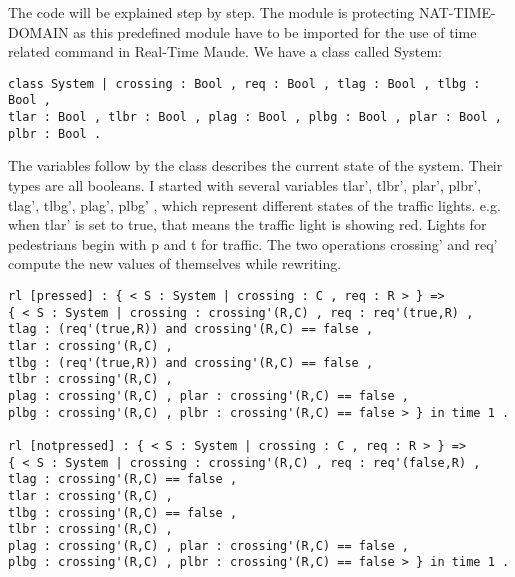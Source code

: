 \documentclass{article}
\begin{document}
The code will be explained step by step. 
The module is protecting NAT-TIME-DOMAIN as this predefined module have to be imported for the use of time related command in Real-Time Maude.
We have a class called System:
\begin{verbatim}
class System | crossing : Bool , req : Bool , tlag : Bool , tlbg : Bool , 
tlar : Bool , tlbr : Bool , plag : Bool , plbg : Bool , plar : Bool , plbr : Bool .
\end{verbatim}
The variables follow by the class describes the current state of the system. Their types are all  booleans.
I started with several variables tlar', tlbr', plar', plbr', tlag', tlbg', plag', plbg' , which represent different states of the  traffic lights. e.g. when tlar' is set to true, that means the traffic light is showing red. Lights for pedestrians  begin with p and t for traffic. 
The two operations crossing' and req' compute the new values of themselves while rewriting.

\newpage
\begin{verbatim}
rl [pressed] : { < S : System | crossing : C , req : R > } => 
{ < S : System | crossing : crossing'(R,C) , req : req'(true,R) , 
tlag : (req'(true,R)) and crossing'(R,C) == false ,
tlar : crossing'(R,C) ,
tlbg : (req'(true,R)) and crossing'(R,C) == false , 
tlbr : crossing'(R,C) ,
plag : crossing'(R,C) , plar : crossing'(R,C) == false ,
plbg : crossing'(R,C) , plbr : crossing'(R,C) == false > } in time 1 .

rl [notpressed] : { < S : System | crossing : C , req : R > } => 
{ < S : System | crossing : crossing'(R,C) , req : req'(false,R) , 
tlag : crossing'(R,C) == false ,
tlar : crossing'(R,C) ,
tlbg : crossing'(R,C) == false , 
tlbr : crossing'(R,C) ,
plag : crossing'(R,C) , plar : crossing'(R,C) == false ,
plbg : crossing'(R,C) , plbr : crossing'(R,C) == false > } in time 1 .
\end{verbatim}
\end{document}
